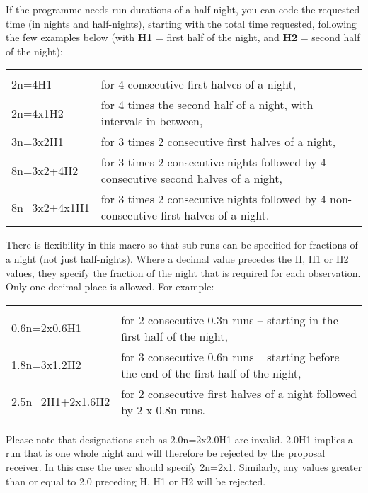 \documentclass{article}
\begin{document}
\bigskip

If the programme needs run durations of a half-night, you can code the
requested time (in nights and half-nights), starting with the total
time requested, following the few examples below (with {\bf H1} =
first half of the night, and {\bf H2} = second half of the night):

\begin{tabular}{ll}
& \\
2n=4H1     & for 4 consecutive first halves of a night, \\
2n=4x1H2   & for 4 times the second half of a night, with intervals in between,\\   
3n=3x2H1  & for 3 times 2 consecutive first halves of a night, \\   
8n=3x2+4H2& for 3 times 2 consecutive nights followed by 4 consecutive second halves of a night, \\
8n=3x2+4x1H1& for 3 times 2 consecutive nights followed by 4 non-consecutive first halves of a night. \\
\end{tabular}

\bigskip

There is flexibility in this macro so that sub-runs
can be specified for fractions of a night  (not just half-nights).
Where a decimal value precedes the H, H1 or H2 values, they specify the
fraction of the night that is required for each observation. Only
one decimal place is allowed.
For example:

\begin{tabular}{ll}
& \\
0.6n=2x0.6H1     & for 2 consecutive 0.3n runs -- starting in the first half of the night, \\
1.8n=3x1.2H2    & for  3 consecutive 0.6n runs -- starting before the end of the first half of the night, \\
2.5n=2H1+2x1.6H2 & for 2 consecutive first halves of a night followed by 2 x 0.8n runs.\\
\end{tabular}

Please note that designations such as 2.0n=2x2.0H1 are invalid. 2.0H1 implies a run that is one whole night and will therefore be rejected by the proposal receiver.
In this case the user should specify 2n=2x1.
Similarly, any values greater than or equal to 2.0 preceding
H, H1 or H2 will be rejected.
\end{document}
